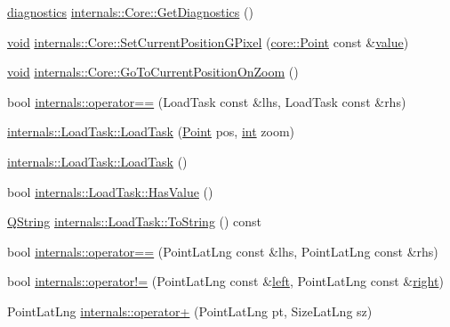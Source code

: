 \begin{DoxyCompactItemize}
\item 
\hyperlink{structdiagnostics}{diagnostics} \hyperlink{group___o_p_map_widget_ga32889efb3fd780403d2005980b0a7dfc}{internals\-::\-Core\-::\-Get\-Diagnostics} ()
\item 
\hyperlink{group___u_a_v_objects_plugin_ga444cf2ff3f0ecbe028adce838d373f5c}{void} \hyperlink{group___o_p_map_widget_ga8d0da9c286137deb71b187c5b003d968}{internals\-::\-Core\-::\-Set\-Current\-Position\-G\-Pixel} (\hyperlink{structcore_1_1_point}{core\-::\-Point} const \&\hyperlink{glext_8h_aa0e2e9cea7f208d28acda0480144beb0}{value})
\item 
\hyperlink{group___u_a_v_objects_plugin_ga444cf2ff3f0ecbe028adce838d373f5c}{void} \hyperlink{group___o_p_map_widget_ga65f1168da5561bfccb2ac0053f031027}{internals\-::\-Core\-::\-Go\-To\-Current\-Position\-On\-Zoom} ()
\item 
bool \hyperlink{group___o_p_map_widget_gad390d22cc7b9cc4af3c37661d580f900}{internals\-::operator==} (Load\-Task const \&lhs, Load\-Task const \&rhs)
\item 
\hyperlink{group___o_p_map_widget_gaef6bad3b01c5866351b69c90979f260e}{internals\-::\-Load\-Task\-::\-Load\-Task} (\hyperlink{structcore_1_1_point}{Point} pos, \hyperlink{ioapi_8h_a787fa3cf048117ba7123753c1e74fcd6}{int} zoom)
\item 
\hyperlink{group___o_p_map_widget_gab83d811cb8cb0cb08d8c56cad76df071}{internals\-::\-Load\-Task\-::\-Load\-Task} ()
\item 
bool \hyperlink{group___o_p_map_widget_ga158bba758e9847d68a36eb0efee84342}{internals\-::\-Load\-Task\-::\-Has\-Value} ()
\item 
\hyperlink{group___u_a_v_objects_plugin_gab9d252f49c333c94a72f97ce3105a32d}{Q\-String} \hyperlink{group___o_p_map_widget_gadf111b2f1982ddca99c4a295856c3968}{internals\-::\-Load\-Task\-::\-To\-String} () const 
\item 
bool \hyperlink{group___o_p_map_widget_ga07dad6b9c91069f83e0e5a90ec53af87}{internals\-::operator==} (Point\-Lat\-Lng const \&lhs, Point\-Lat\-Lng const \&rhs)
\item 
bool \hyperlink{group___o_p_map_widget_ga50aa89260018f2e102183443c663b4b4}{internals\-::operator!=} (Point\-Lat\-Lng const \&\hyperlink{glext_8h_a85b8f6c07fbc1fb5d77c2ae090f21995}{left}, Point\-Lat\-Lng const \&\hyperlink{glext_8h_a5ffadbbacc6b89cf6218bc43b384d3fe}{right})
\item 
Point\-Lat\-Lng \hyperlink{group___o_p_map_widget_ga0c71f763d92eeb6946eddcb6d939fddb}{internals\-::operator+} (Point\-Lat\-Lng pt, Size\-Lat\-Lng sz)

\end{DoxyCompactItemize}
